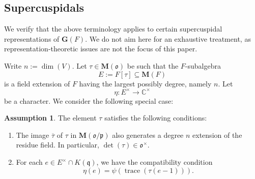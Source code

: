 \documentclass[reqno]{amsart}
\DeclareMathOperator{\trace}{trace}
\theoremstyle{plain} \newtheorem{theorem} {Theorem} \newtheorem{conjecture} {Conjecture} \newtheorem{corollary} [theorem] {Corollary} \newtheorem{proposition} [theorem] {Proposition} \newtheorem{fact} [theorem] {Fact}
\theoremstyle{definition} \newtheorem{definition} [theorem] {Definition}
\theoremstyle{itplain} %
\newtheorem{Assumption}[theorem]{Assumption} \numberwithin{equation}{section} %
\newcommand{\mfq}{\mathfrak{q}}
\begin{document}
\subsection{Supercuspidals}\label{sec:supercuspidals}
We verify that the above terminology applies to certain supercuspidal representations of $\mathbf{G}(F)$.  We do not aim here for an exhaustive treatment, as representation-theoretic issues are not the focus of this paper.

Write $n := \dim(V)$.  Let $\tau \in \mathbf{M}(\mathfrak{o})$ be such that the $F$-subalgebra
\begin{equation*}
  E := F[\tau] \subseteq \mathbf{M}(F)
\end{equation*}
is a field extension of $F$ having the largest possibly degree, namely $n$.  Let
\begin{equation*}
  \eta : E^\times \rightarrow \mathbb{C}^\times
\end{equation*}
be a character.  We consider the following special case:
\begin{Assumption}\label{Assumption:supercuspidal}
  The element $\tau$ satisfies the following conditions:
  \begin{enumerate}
  \item\label{enumerate:d1bc2d5fbd54} The image $\overline{\tau}$ of $\tau$ in $\mathbf{M}(\mathfrak{o}/\mathfrak{p})$ also generates a degree $n$ extension of the residue field.  In particular, $\det(\tau)\in \mathfrak{o}^\times$.
  \item For each $e \in E^\times \cap K (\mfq)$, we have the compatibility condition
    \begin{equation*}
      \eta(e) = \psi(\trace(\tau (e-1))).
    \end{equation*}
  \end{enumerate}
\end{Assumption}
\end{document}

